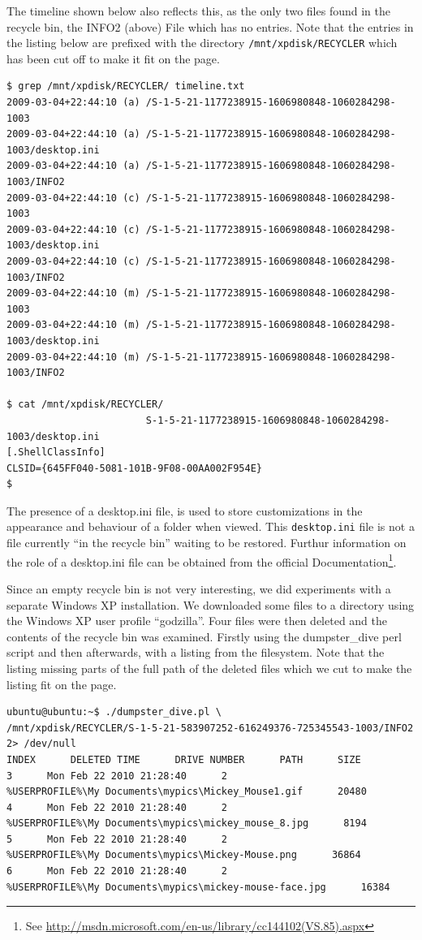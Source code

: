 \documentclass[a4paper,
    11pt,
    normalheadings,
    parindent,
    UKenglish,
    abstracton,
    ]{scrartcl}
\begin{document}
The timeline shown below also reflects this, as the only two files found in the recycle bin, the INFO2 (above) File which has no entries.
Note that the entries in the listing below are prefixed with the directory {\tt /mnt/xpdisk/RECYCLER} which has been cut off to make it fit on the page.
\begin{verbatim}
$ grep /mnt/xpdisk/RECYCLER/ timeline.txt
2009-03-04+22:44:10 (a) /S-1-5-21-1177238915-1606980848-1060284298-1003
2009-03-04+22:44:10 (a) /S-1-5-21-1177238915-1606980848-1060284298-1003/desktop.ini
2009-03-04+22:44:10 (a) /S-1-5-21-1177238915-1606980848-1060284298-1003/INFO2
2009-03-04+22:44:10 (c) /S-1-5-21-1177238915-1606980848-1060284298-1003
2009-03-04+22:44:10 (c) /S-1-5-21-1177238915-1606980848-1060284298-1003/desktop.ini
2009-03-04+22:44:10 (c) /S-1-5-21-1177238915-1606980848-1060284298-1003/INFO2
2009-03-04+22:44:10 (m) /S-1-5-21-1177238915-1606980848-1060284298-1003
2009-03-04+22:44:10 (m) /S-1-5-21-1177238915-1606980848-1060284298-1003/desktop.ini
2009-03-04+22:44:10 (m) /S-1-5-21-1177238915-1606980848-1060284298-1003/INFO2

$ cat /mnt/xpdisk/RECYCLER/
                        S-1-5-21-1177238915-1606980848-1060284298-1003/desktop.ini
[.ShellClassInfo]
CLSID={645FF040-5081-101B-9F08-00AA002F954E}
$
\end{verbatim}

The presence of a desktop.ini file, is used to store customizations in the appearance and behaviour of a folder when viewed.
This \texttt{desktop.ini} file is not a file currently ``in the recycle bin'' waiting to be restored.
Furthur information on the role of a desktop.ini file can be obtained from the official Documentation\footnote{See \url{http://msdn.microsoft.com/en-us/library/cc144102(VS.85).aspx}}.

Since an empty recycle bin is not very interesting, we did experiments with a separate Windows XP installation.
We downloaded some files to a directory using the Windows XP user profile ``godzilla''.
Four files were then deleted and the contents of the recycle bin was examined. Firstly using the dumpster\_dive perl script and then afterwards, with a listing from the filesystem.
Note that the listing missing parts of the full path of the deleted files which we cut to make the listing fit on the page.
\begin{verbatim}
ubuntu@ubuntu:~$ ./dumpster_dive.pl \
/mnt/xpdisk/RECYCLER/S-1-5-21-583907252-616249376-725345543-1003/INFO2 2> /dev/null
INDEX      DELETED TIME      DRIVE NUMBER      PATH      SIZE
3      Mon Feb 22 2010 21:28:40      2
%USERPROFILE%\My Documents\mypics\Mickey_Mouse1.gif      20480
4      Mon Feb 22 2010 21:28:40      2
%USERPROFILE%\My Documents\mypics\mickey_mouse_8.jpg      8194
5      Mon Feb 22 2010 21:28:40      2
%USERPROFILE%\My Documents\mypics\Mickey-Mouse.png      36864
6      Mon Feb 22 2010 21:28:40      2
%USERPROFILE%\My Documents\mypics\mickey-mouse-face.jpg      16384
\end{verbatim}
\end{document}
